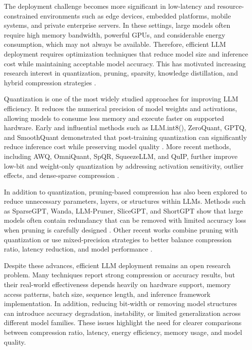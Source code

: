 \documentclass[
11pt, %
english, %
singlespacing, %
headsepline, %
]{MastersDoctoralThesis} %
\begin{document}
The deployment challenge becomes more significant in low-latency and resource-constrained environments such as edge devices, embedded platforms, mobile systems, and private enterprise servers. In these settings, large models often require high memory bandwidth, powerful GPUs, and considerable energy consumption, which may not always be available. Therefore, efficient LLM deployment requires optimization techniques that reduce model size and inference cost while maintaining acceptable model accuracy. This has motivated increasing research interest in quantization, pruning, sparsity, knowledge distillation, and hybrid compression strategies \cite{frantar2023sparsegpt,ma2023llmpruner,sanh2020distilbert,jiao2020tinybert}.

Quantization is one of the most widely studied approaches for improving LLM efficiency. It reduces the numerical precision of model weights and activations, allowing models to consume less memory and execute faster on supported hardware. Early and influential methods such as LLM.int8(), ZeroQuant, GPTQ, and SmoothQuant demonstrated that post-training quantization can significantly reduce inference cost while preserving model quality \cite{dettmers2022llmint8,yao2022zeroquant,frantar2023gptq,xiao2023smoothquant}. More recent methods, including AWQ, OmniQuant, SpQR, SqueezeLLM, and QuIP, further improve low-bit and weight-only quantization by addressing activation sensitivity, outlier effects, and dense-sparse compression \cite{lin2024awq,dettmers2024spqr,shao2024omniquant,kim2024squeezellm,chee2023quip}.

In addition to quantization, pruning-based compression has also been explored to reduce unnecessary parameters, layers, or structures within LLMs. Methods such as SparseGPT, Wanda, LLM-Pruner, SliceGPT, and ShortGPT show that large models often contain redundancy that can be removed with limited accuracy loss when pruning is carefully designed \cite{frantar2023sparsegpt,ma2023llmpruner,sun2024wanda,ashkboos2024slicegpt,men2024shortgpt}. Other recent works combine pruning with quantization or use mixed-precision strategies to better balance compression ratio, latency reduction, and model performance \cite{xu2026daypq,cho2025sub4bit,wang2025ofqllm}.

Despite these advances, efficient LLM deployment remains an open research problem. Many techniques report strong compression or accuracy results, but their real-world effectiveness depends heavily on hardware support, memory access patterns, batch size, sequence length, and inference framework implementation. In addition, reducing bit-width or removing model structures can introduce accuracy degradation, instability, or limited generalization across different model families. These issues highlight the need for clearer comparisons between compression ratio, latency, energy efficiency, memory usage, and model quality.
\end{document}
